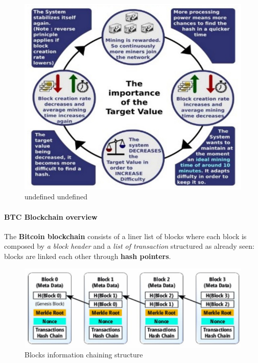 \documentclass[10pt,a4paper]{report}
\begin{document}
\begin{figure}[h]
	\centering
	\includegraphics[scale=0.50]{images/Pasted image 20230405120125.png}
	\caption{undefined undefined}\end{figure}

\paragraph{BTC Blockchain overview}\label{sec:btc-blockchain-overview}
The  \textbf{Bitcoin blockchain} consists of a liner list of blocks where each block is composed by \textit{a block header} and a \textit{list of transaction} structured as already seen: blocks are linked each other through \textbf{hash pointers}.

\begin{figure}[h]
	\centering
	\includegraphics[scale=0.50]{images/Pasted image 20230405120933.png}
	\caption{Blocks information chaining structure}\end{figure}
\end{document}
